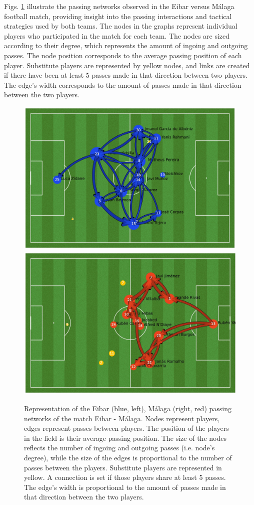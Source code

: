 \documentclass[
  10pt,
  twoside,nohyper]{book}
\begin{document}
Figs. \ref{fig:homepass} illustrate the
passing networks observed in the Eibar versus Málaga football match,
providing insight into the passing interactions and tactical strategies
used by both teams. The nodes in the graphs represent individual players
who participated in the match for each team. The nodes are sized
according to their degree, which represents the amount of ingoing and
outgoing passes. The node position corresponds to the average passing
position of each player. Substitute players are represented by yellow nodes,
and links are created if there have been at least 5 passes made in that
direction between two players. The edge's width corresponds to the
amount of passes made in that direction between the two players.

\begin{figure}[H]

{\centering \includegraphics[width=0.5\linewidth,]{imagenes/home_pass_network} \includegraphics[width=0.5\linewidth,]{imagenes/away_pass_network} 

}

\caption{Representation of the Eibar (blue, left), Málaga (right, red) passing networks of the match Eibar - Málaga. Nodes represent players, edges represent passes between players. The position of the players in the field is their average passing position. The size of the nodes reflects the number of ingoing and outgoing passes (i.e. node’s degree), while the size of the edges is proportional to the number of passes between the players. Substitute players are represented in yellow. A connection is set if those players share at least 5 passes. The edge’s width is proportional to the amount of passes made in that direction between the two players.}\label{fig:homepass}
\end{figure}
\end{document}
